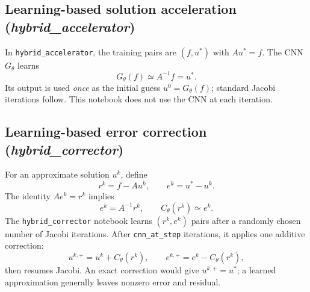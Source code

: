 \documentclass[11pt,a4paper]{article}
\begin{document}
\subsection{Learning-based solution acceleration (\textit{hybrid\_accelerator})}

In \texttt{hybrid\_accelerator}, the training pairs are $(f,u^*)$ with $Au^*=f$. The CNN $G_\theta$ learns
\[\boxed{G_\theta(f)\simeq A^{-1}f=u^*.}\]
Its output is used \emph{once} as the initial guess $u^0=G_\theta(f)$; standard Jacobi iterations follow. This notebook does not use the CNN at each iteration.
\begin{center}\end{center}

\subsection{Learning-based error correction (\textit{hybrid\_corrector})}

For an approximate solution $u^k$, define
\[r^k=f-Au^k,\qquad e^k=u^*-u^k.\]
The identity $Ae^k=r^k$ implies
\[\boxed{e^k=A^{-1}r^k,\qquad C_\theta(r^k)\simeq e^k.}\]
The \texttt{hybrid\_corrector} notebook learns $(r^k,e^k)$ pairs after a randomly chosen number of Jacobi iterations. After \texttt{cnn\_at\_step} iterations, it applies one additive correction:
\[u^{k,+}=u^k+C_\theta(r^k),\qquad e^{k,+}=e^k-C_\theta(r^k),\]
then resumes Jacobi. An exact correction would give $u^{k,+}=u^*$; a learned approximation generally leaves nonzero error and residual.
\begin{center}\end{center}
\end{document}
